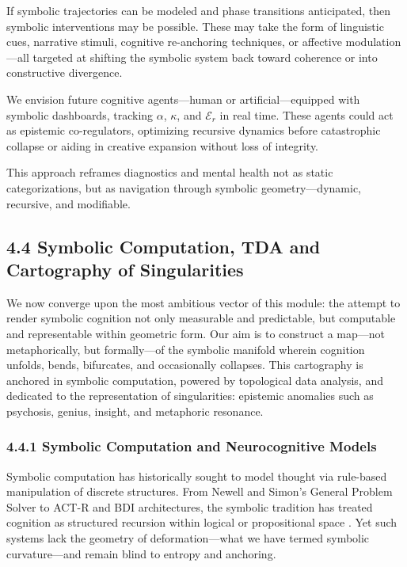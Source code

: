 If symbolic trajectories can be modeled and phase transitions anticipated, then symbolic interventions may be possible. These may take the form of linguistic cues, narrative stimuli, cognitive re-anchoring techniques, or affective modulation—all targeted at shifting the symbolic system back toward coherence or into constructive divergence.

We envision future cognitive agents—human or artificial—equipped with symbolic dashboards, tracking $\alpha$, $\kappa$, and $\mathcal{E}_r$ in real time. These agents could act as epistemic co-regulators, optimizing recursive dynamics before catastrophic collapse or aiding in creative expansion without loss of integrity.

This approach reframes diagnostics and mental health not as static categorizations, but as navigation through symbolic geometry—dynamic, recursive, and modifiable.
\subsection*{4.4 Symbolic Computation, TDA and Cartography of Singularities}

We now converge upon the most ambitious vector of this module: the attempt to render symbolic cognition not only measurable and predictable, but computable and representable within geometric form. Our aim is to construct a map—not metaphorically, but formally—of the symbolic manifold wherein cognition unfolds, bends, bifurcates, and occasionally collapses. This cartography is anchored in symbolic computation, powered by topological data analysis, and dedicated to the representation of singularities: epistemic anomalies such as psychosis, genius, insight, and metaphoric resonance.

\subsubsection*{4.4.1 Symbolic Computation and Neurocognitive Models}

Symbolic computation has historically sought to model thought via rule-based manipulation of discrete structures. From Newell and Simon’s General Problem Solver to ACT-R and BDI architectures, the symbolic tradition has treated cognition as structured recursion within logical or propositional space \cite{newell1980physical, anderson1996actr, rao1995bdi}. Yet such systems lack the geometry of deformation—what we have termed symbolic curvature—and remain blind to entropy and anchoring.

